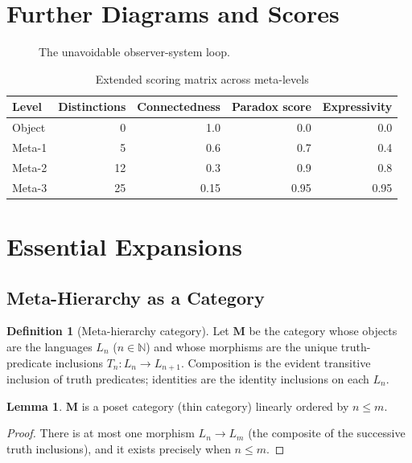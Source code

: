 \documentclass[11pt,a4paper]{article}
\theoremstyle{definition}
\newtheorem{lemma}[theorem]{Lemma}
\newtheorem{definition}[theorem]{Definition}
\begin{document}
\appendix
\section{Further Diagrams and Scores}
\begin{figure}[h]
\centering
{}
\caption{The unavoidable observer-system loop.}
\end{figure}

\begin{table}[h]
\centering
\caption{Extended scoring matrix across meta-levels}
\begin{tabular}{lrrrr}
\toprule
Level & Distinctions & Connectedness & Paradox score & Expressivity \\
\midrule
Object & 0 & 1.0 & 0.0 & 0.0 \\
Meta-1 & 5 & 0.6 & 0.7 & 0.4 \\
Meta-2 & 12 & 0.3 & 0.9 & 0.8 \\
Meta-3 & 25 & 0.15 & 0.95 & 0.95 \\
\bottomrule
\end{tabular}
\end{table}

\section{Essential Expansions}

\subsection{Meta-Hierarchy as a Category}
\begin{definition}[Meta-hierarchy category]
Let \(\mathbf{M}\) be the category whose objects are the languages \(L_n\) (\(n\in\mathbb{N}\)) and whose morphisms are the unique truth-predicate inclusions \(T_n:L_n\to L_{n+1}\). Composition is the evident transitive inclusion of truth predicates; identities are the identity inclusions on each \(L_n\).
\end{definition}
\begin{lemma}
\(\mathbf{M}\) is a poset category (thin category) linearly ordered by \(n\le m\).
\end{lemma}
\begin{proof}
There is at most one morphism \(L_n\to L_m\) (the composite of the successive truth inclusions), and it exists precisely when \(n\le m\).
\end{proof}
\end{document}
